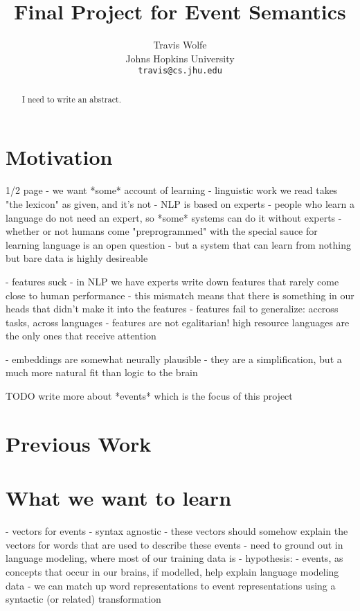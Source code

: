 \documentclass[11pt,letterpaper]{article}
\title{Final Project for Event Semantics}
\author{Travis Wolfe\\
	    Johns Hopkins University \\
	    {\tt travis@cs.jhu.edu}
}
\date{}
\begin{document}
\maketitle
\begin{abstract}
  I need to write an abstract.
\end{abstract}

\section{Motivation}
1/2 page
- we want *some* account of learning
	- linguistic work we read takes "the lexicon" as given, and it's not
	- NLP is based on experts
	- people who learn a language do not need an expert, so *some* systems can do it without experts
	- whether or not humans come "preprogrammed" with the special sauce for learning language is an open question
	- but a system that can learn from nothing but bare data is highly desireable

- features suck
	- in NLP we have experts write down features that rarely come close to human performance
	- this mismatch means that there is something in our heads that didn't make it into the features
	- features fail to generalize: accross tasks, across languages
	- features are not egalitarian! high resource languages are the only ones that receive attention

- embeddings are somewhat neurally plausible
	- they are a simplification, but a much more natural fit than logic to the brain

TODO write more about *events* which is the focus of this project


\section{Previous Work} %


\section{What we want to learn} %
- vectors for events
	- syntax agnostic
- these vectors should somehow explain the vectors for words that are used to describe these events
	- need to ground out in language modeling, where most of our training data is
- hypothesis:
	- events, as concepts that occur in our brains, if modelled, help explain language modeling data
	- we can match up word representations to event representations using a syntactic (or related) transformation
\end{document}
